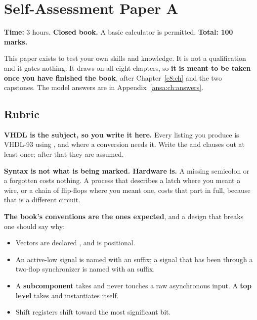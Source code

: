 
\chapter{Self-Assessment Paper A}
\label{exa:ch:paper}

\noindent\textbf{Time:} 3 hours. \textbf{Closed book.} A basic calculator is permitted.
\textbf{Total: 100 marks.}

This paper exists to test your own skills and knowledge. It is not a qualification and it gates
nothing. It draws on all eight chapters, so \textbf{it is meant to be taken once you have finished
the book}, after Chapter~\ref{c8:ch} and the two capstones. The model answers are in
Appendix~\ref{ansa:ch:answers}.

\section*{Rubric}
\textbf{VHDL is the subject, so you write it here.} Every listing you produce is VHDL-93 using
, and  where a conversion needs it. Write the
 and  clauses out at least once; after that they are assumed.

\textbf{Syntax is not what is being marked. Hardware is.} A missing semicolon or a forgotten
 costs nothing. A process that describes a latch where you meant a wire, or a chain of
flip-flops where you meant one, costs that part in full, because that is a different circuit.

\textbf{The book's conventions are the ones expected}, and a design that breaks one should say why:
\begin{itemize}
  \item Vectors are declared , and  is positional.
  \item An active-low signal is named with an  suffix; a signal that has been through a
    two-flop synchronizer is named with an  suffix.
  \item A \textbf{subcomponent} takes  and never touches a raw asynchronous input.
    A \textbf{top level} takes  and instantiates  itself.
  \item Shift registers shift toward the most significant bit.
\end{itemize}

